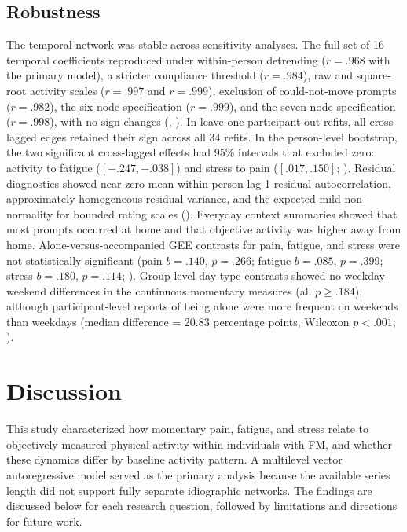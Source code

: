 \documentclass[11pt,a4paper]{article}
\begin{document}


\subsection{Robustness}
The temporal network was stable across sensitivity analyses. The full set of 16 temporal
coefficients reproduced under within-person detrending ($r=.968$ with the primary model),
a stricter compliance threshold ($r=.984$), raw and square-root activity scales ($r=.997$ and
$r=.999$), exclusion of could-not-move prompts ($r=.982$), the six-node specification
($r=.999$), and the seven-node specification ($r=.998$), with no sign changes
(, ). In
leave-one-participant-out refits, all cross-lagged edges retained their sign across all
34 refits. In the person-level bootstrap, the two significant cross-lagged effects had 95\%
intervals that excluded zero: activity to fatigue ($[-.247, -.038]$) and stress to pain
($[.017, .150]$; ). Residual diagnostics showed near-zero mean
within-person lag-1 residual autocorrelation, approximately homogeneous residual variance,
and the expected mild non-normality for bounded rating scales ().
Everyday context summaries showed that most prompts occurred at home and that objective
activity was higher away from home. Alone-versus-accompanied GEE contrasts for pain,
fatigue, and stress were not statistically significant (pain $b=.140$, $p=.266$; fatigue
$b=.085$, $p=.399$; stress $b=.180$, $p=.114$; ). Group-level day-type
contrasts showed no weekday-weekend differences in the continuous momentary measures (all
$p \geq .184$), although participant-level reports of being alone were more frequent on
weekends than weekdays (median difference = 20.83 percentage points, Wilcoxon $p<.001$;
).

\section{Discussion}
This study characterized how momentary pain, fatigue, and stress relate to objectively
measured physical activity within individuals with FM, and whether these dynamics differ by
baseline activity pattern. A multilevel vector autoregressive model served as the primary
analysis because the available series length did not support fully separate idiographic
networks. The findings are discussed below for each research question, followed by limitations
and directions for future work.
\end{document}
